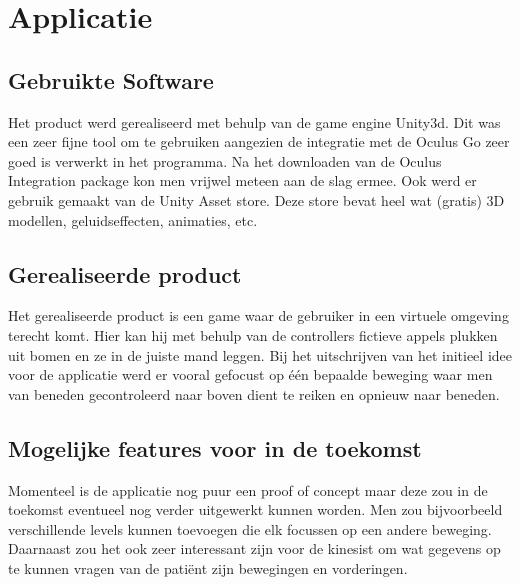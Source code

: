 \chapter{Applicatie}
\label{ch:applicatie}

\section{Gebruikte Software}
Het product werd gerealiseerd met behulp van de game engine Unity3d. Dit was een zeer fijne tool om te gebruiken aangezien de integratie met de Oculus Go zeer goed is verwerkt in het programma. Na het downloaden van de Oculus Integration package kon men vrijwel meteen aan de slag ermee. Ook werd er gebruik gemaakt van de Unity Asset store. Deze store bevat heel wat (gratis) 3D modellen, geluidseffecten, animaties, etc.

\section{Gerealiseerde product}
Het gerealiseerde product is een game waar de gebruiker in een virtuele omgeving terecht komt. Hier kan hij met behulp van de controllers fictieve appels plukken uit bomen en ze in de juiste mand leggen. Bij het uitschrijven van het initieel idee voor de applicatie werd er vooral gefocust op één bepaalde beweging waar men van beneden gecontroleerd naar boven dient te reiken en opnieuw naar beneden.


\section{Mogelijke features voor in de toekomst}
Momenteel is de applicatie nog puur een proof of concept maar deze zou in de toekomst eventueel nog verder uitgewerkt kunnen worden. Men zou bijvoorbeeld verschillende levels kunnen toevoegen die elk focussen op een andere beweging. Daarnaast zou het ook zeer interessant zijn voor de kinesist om wat gegevens op te kunnen vragen van de patiënt zijn bewegingen en vorderingen.
